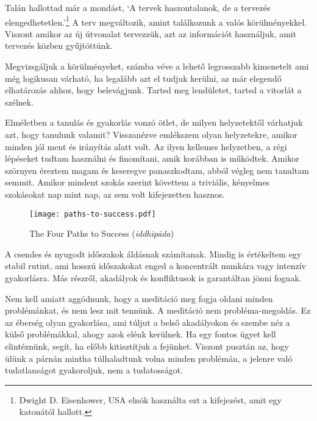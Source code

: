 
Talán hallottad már a mondást, `A tervek haszontalanok, de a tervezés
elengedhetetlen.'\footnote{Dwight D. Eisenhower, USA elnök használta ezt
  a kifejezést, amit egy katonától hallott.} A terv megváltozik, amint
találkozunk a valós körülményekkel. Viszont amikor az új útvonalat
tervezzük, azt az információt használjuk, amit tervezés közben
gyűjtöttünk.

Megvizsgáljuk a körülményeket, számba véve a lehető legrosszabb
kimenetelt ami még logikusan várható, ha legalább azt el tudjuk kerülni,
az már elegendő elhatározás ahhoz, hogy belevágjunk. Tartsd meg
lendületet, tartsd a vitorlát a szélnek.

Elméletben a tanulás és gyakorlás vonzó ötlet, de milyen helyzetektől
várhatjuk azt, hogy tanulunk valamit? Visszanézve emlékszem olyan
helyzetekre, amikor minden jól ment és irányítás alatt volt. Az ilyen
kellemes helyzetben, a régi lépéseket tudtam használni és finomítani,
amik korábban is működtek. Amikor szörnyen éreztem magam és keseregve
panaszkodtam, abból végleg nem tanultam semmit. Amikor mindent szokás
szerint követtem a triviális, kényelmes szokásokat nap mint nap, az sem
volt kifejezetten hasznos.

\clearpage
\null\vfill

\begin{figure}[h]
\caption{The Four Paths to Success (\emph{iddhipāda})}\label{fig-success}

\centering

\texttt{[image: paths-to-success.pdf]}

\end{figure}

\vfill\null
\clearpage

A csendes és nyugodt időszakok áldásnak számítanak. Mindig is értékeltem
egy stabil rutint, ami hosszú időszakokat enged a koncentrált munkára
vagy intenzív gyakorlásra. Más részről, akadályok és konfliktusok is
garantáltan jönni fognak.

Nem kell amiatt aggódnunk, hogy a meditáció meg fogja oldani minden
problémánkat, és nem lesz mit tennünk. A meditáció nem
probléma-megoldás. Ez az éberség olyan gyakorlása, ami túljut a belső
akadályokon és szembe néz a külső problémákkal, ahogy azok elénk
kerülnek. Ha egy fontos ügyet kell elintéznünk, segít, ha előbb
kitisztítjuk a fejünket. Viszont pusztán az, hogy ülünk a párnán mintha
túlhaladtunk volna minden problémán, a jelenre való tudatlanságot
gyakoroljuk, nem a tudatosságot.

